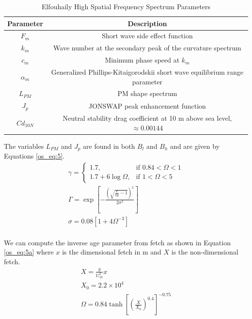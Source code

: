 \begin{table}[H]
  \begin{center}
      \renewcommand{\baselinestretch}{1} \small\normalsize
  \begin{quote}
    \caption[Elfouhaily High Spatial Frequency Spectrum Parameters]{Elfouhaily High Spatial Frequency Spectrum Parameters\label{os_tab:2}}
  \end{quote}
  \begin{tabular} {|c | c |}
    \hline
  \bf{Parameter} & \bf{Description} \\ \hline
  $F_m$ & Short wave side effect function \\ \hline
  $k_m$ &  Wave number at the secondary peak of the curvature spectrum \\ \hline
  $c_m$ &  Minimum phase speed at $k_m$ \\ \hline
  $\alpha_m$ & Generalized Phillips-Kitaigorodskii short wave equilibrium range parameter \\ \hline
  $L_{PM}$ & PM shape spectrum \\ \hline
  $J_p$ & JONSWAP peak enhancement function \\ \hline
  $Cd_{10N}$ & Neutral stability drag coefficient at 10 m above sea level, $\approx 0.00144$ \\ \hline
\end{tabular}
\end{center}
\end{table}
\renewcommand{\baselinestretch}{2} \small\normalsize
The variables $L_{PM}$ and $J_p$ are found in both $B_l$ and $B_h$ and are given by Equations \ref{os_eq:5}.
\begin{equation}
\begin{gathered}
  \label{os_eq:5}
    \gamma = \begin{cases}
    1.7,& \text{if } 0.84 < \Omega < 1\\
    1.7 + 6\log{\Omega}, & \text{if } 1 < \Omega < 5
  \end{cases} \\
  \Gamma = \exp{\left[- \frac{\left(\sqrt{\frac{k}{kp} - 1} \right)^2}{2\sigma^2} \right]} \\
  \sigma = 0.08\left[1 + 4\Omega^{-3} \right] \\
\end{gathered}
\end{equation}
\renewcommand{\baselinestretch}{2} \small\normalsize

We can compute the inverse age parameter from fetch as shown in Equation \ref{os_eq:5a} where $x$ is the dimensional fetch in m and $X$ is the non-dimensional fetch.
\begin{equation}
\label{os_eq:5a}
\begin{gathered}
 X = \frac{g}{U_{10}^2}x\\
 X_0 = 2.2 \times 10^4 \\
 \Omega = 0.84\tanh\left[\left(\frac{X}{X_0} \right)^{0.4} \right]^{-0.75} \\
\end{gathered}
\end{equation}
\renewcommand{\baselinestretch}{2} \small\normalsize

